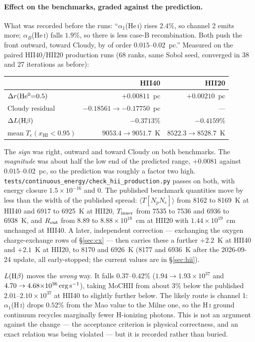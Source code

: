 \documentclass[english,a4paper]{my_memo}
\newcommand{\code}[1]{\texttt{#1}}
\newcommand{\xHI}{x_{\mathrm{HI}}}
\begin{document}
\paragraph{Effect on the benchmarks, graded against the prediction.}  What
was recorded before the runs: ``$\alpha_1$(He\,\textsc{i}) rises $2.4\%$, so
channel 2 emits more; $\alpha_B$(He\,\textsc{i}) falls $1.9\%$, so there is
less case-B recombination.  Both push the front outward, toward Cloudy, by
of order $0.015$--$0.02$~pc.''  Measured on the paired HII40/HII20
production runs (68 ranks, same Sobol seed, converged in 38 and 27
iterations as before):
\begin{center}\small
\begin{tabular}{@{}lrr@{}}
\toprule
 & HII40 & HII20 \\
\midrule
$\Delta r({\rm He^0}{=}0.5)$ & $+0.00811$~pc & $+0.00210$~pc \\
Cloudy residual & $-0.18561 \to -0.17750$~pc & --- \\
$\Delta L({\rm H}\beta)$ & $-0.3713\%$ & $-0.4159\%$ \\
mean $T_e(\xHI < 0.95)$ & $9053.4 \to 9051.7$~K & $8522.3 \to 8528.7$~K \\
\bottomrule
\end{tabular}
\end{center}
The \emph{sign} was right, outward and toward Cloudy on both benchmarks.
The \emph{magnitude} was about half the low end of the predicted range,
$+0.0081$ against $0.015$--$0.02$~pc, so the prediction was roughly a factor
two high.  \code{tests/continuous\_energy/check\_hii\_production.py} passes
on both, with energy closure $1.5{\times}10^{-16}$ and $0$.  The published
benchmark quantities move by less than the width of the published spread:
$\langle T[N_pN_e]\rangle$ from 8162 to 8169~K at HII40 and 6917 to 6925~K
at HII20, $T_{\rm inner}$ from 7535 to 7536 and 6936 to 6938~K, and $R_{\rm
out}$ from $8.89$ to $8.88{\times}10^{18}$~cm at HII20 with
$1.44{\times}10^{19}$~cm unchanged at HII40.  A later, independent
correction --- exchanging the oxygen charge-exchange rows of
\S\ref{sec:cx} --- then carries these a further $+2.2$~K at HII40 and
$+2.1$~K at HII20, to 8170 and 6926~K (8177 and 6936~K after the 2026-09-24
update, all early-stopped; the current values are in \S\ref{sec:hii}).

$L({\rm H}\beta)$ moves the \emph{wrong} way.  It falls $0.37$--$0.42\%$
($1.94 \to 1.93{\times}10^{37}$ and $4.70 \to 4.68{\times}10^{36}\,{\rm
erg\,s^{-1}}$), taking MoCHII from about $3\%$ below the published
$2.01$--$2.10{\times}10^{37}$ at HII40 to slightly further below.  The
likely route is channel 1: $\alpha_1$(H\,\textsc{i}) drops $0.52\%$ from the
Mao value to the Milne one, so the H\,\textsc{i} ground continuum recycles
marginally fewer H-ionizing photons.  This is not an argument against the
change --- the acceptance criterion is physical correctness, and an exact
relation was being violated --- but it is recorded rather than buried.
\end{document}
